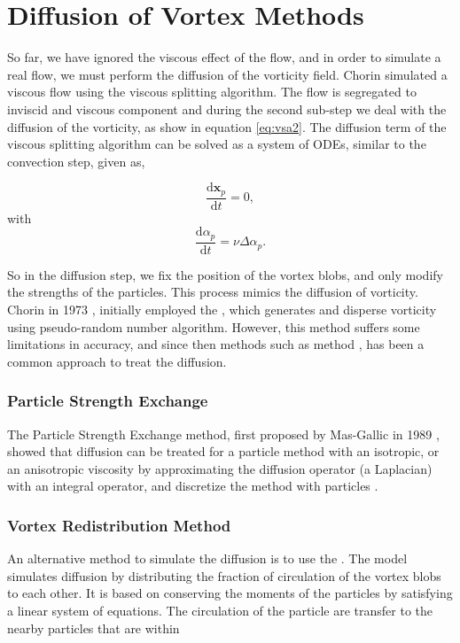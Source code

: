 \section{Diffusion of Vortex Methods}
\label{sec:diffusionVM}

So far, we have ignored the viscous effect of the flow, and in order to simulate a real flow, we must perform the diffusion of the vorticity field. Chorin simulated a viscous flow using the viscous splitting algorithm. The flow is segregated to inviscid and viscous component and during the second sub-step we deal with the diffusion of the vorticity, as show in equation \ref{eq:vsa2}. The diffusion term of the viscous splitting algorithm can be solved as a system of ODEs, similar to the convection step, given as,

	\begin{equation}
	\frac{\mathrm{d}\mathbf{x}_p}{\mathrm{d}t} = 0,
	\end{equation}
with
	\begin{equation}
	\frac{\mathrm{d}\alpha_p}{\mathrm{d}t} = \nu\Delta\alpha_p.
	\end{equation}

So in the diffusion step, we fix the position of the vortex blobs, and only modify the strengths of the particles. This process mimics the diffusion of vorticity. Chorin in 1973 \cite{Chorin1973}, initially employed the , which generates and disperse vorticity using pseudo-random number algorithm. However, this method suffers some limitations in accuracy, and since then methods such as  method \cite{Degond1989}, has been a common approach to treat the diffusion.

\subsubsection*{Particle Strength Exchange}
The Particle Strength Exchange method, first proposed by Mas-Gallic in 1989 \cite{Degond1989}, showed that diffusion can be treated for a particle method with an isotropic, or an anisotropic viscosity by approximating the diffusion operator (a Laplacian) with an integral operator, and discretize the method with particles \cite{Speck2011a}. %
 
\subsubsection*{Vortex Redistribution Method}
An alternative method to simulate the diffusion is to use the  \cite{Shankar1996}. The model simulates diffusion by distributing the fraction of circulation of the vortex blobs to each other. It is based on conserving the moments of the particles by satisfying a linear system of equations. The circulation of the particle are transfer to the nearby particles that are within

